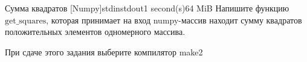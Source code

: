 \begin{problem}{Сумма квадратов [Numpy]}{stdin}{stdout}{1 second(s)}{64 MiB}
 Напишите функцию $\text{get_squares}$, которая принимает на вход numpy-массив находит сумму квадратов положительных элементов одномерного массива.
\InputFile

\OutputFile

\Examples
\begin{example}
\end{example}\Note
 При сдаче этого задания выберите компилятор make2
\end{problem}
